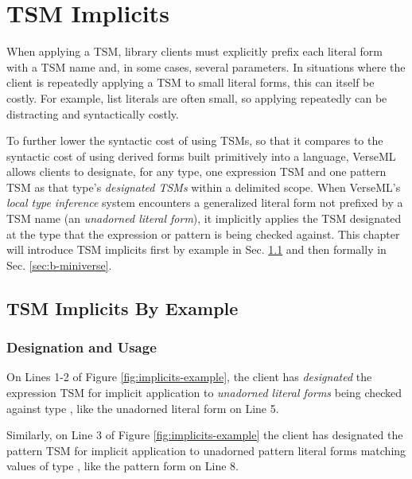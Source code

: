 \chapter{TSM Implicits}\label{chap:tsls}
When applying a TSM, library clients must explicitly prefix each literal form with a TSM name and, in some cases, several parameters. In situations where the client is repeatedly applying a TSM to small literal forms, this can itself be costly. For example, list literals are often small, so applying  repeatedly can be distracting and syntactically costly.

To further lower the syntactic cost of using TSMs, so that it compares to the syntactic cost of using derived forms built primitively into a language, VerseML allows clients to designate, for any type, one expression TSM and one pattern TSM as that type's \emph{designated TSMs} within a delimited scope. When VerseML's \emph{local type inference} system encounters a generalized literal form not prefixed by a TSM name (an \emph{unadorned literal form}), it implicitly applies the TSM designated at the type that the expression or pattern is being checked against. 
This chapter will introduce {TSM implicits} first by example in Sec. \ref{sec:tsm-implicits-by-example} and then formally in Sec. \ref{sec:b-miniverse}. %

\section{TSM Implicits By Example}\label{sec:tsm-implicits-by-example}
\subsection{Designation and Usage}
On Lines 1-2 of Figure \ref{fig:implicits-example}, the client has \emph{designated} the expression TSM  for implicit application to \emph{unadorned literal forms} being checked against type , like the unadorned literal form on Line 5. 

Similarly, on Line 3 of Figure \ref{fig:implicits-example} the client has designated the pattern TSM  for implicit application to unadorned pattern literal forms matching values of type , like the pattern form on Line 8.

